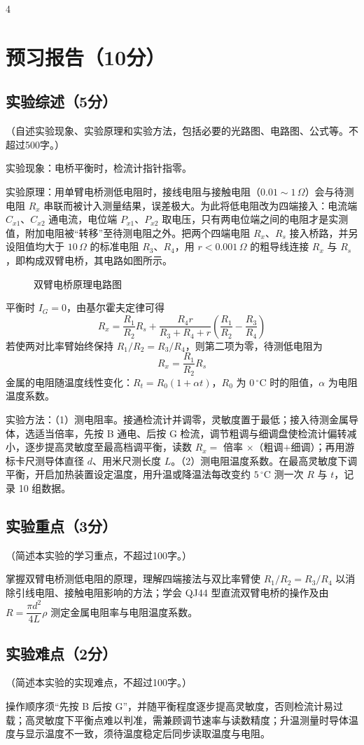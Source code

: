 4\documentclass{Preport}
\begin{document}
\setcounter{page}{1}
\makecover

\section{预习报告（10分）}
\subsection{实验综述（5分）}
（自述实验现象、实验原理和实验方法，包括必要的光路图、电路图、公式等。不超过500字。）

实验现象：电桥平衡时，检流计指针指零。

实验原理：用单臂电桥测低电阻时，接线电阻与接触电阻（$0.01\sim1\,\Omega$）会与待测电阻 $R_x$ 串联而被计入测量结果，误差极大。为此将低电阻改为四端接入：电流端 $C_{x1}$、$C_{x2}$ 通电流，电位端 $P_{x1}$、$P_{x2}$ 取电压，只有两电位端之间的电阻才是实测值，附加电阻被“转移”至待测电阻之外。把两个四端电阻 $R_x$、$R_s$ 接入桥路，并另设阻值均大于 $10\,\Omega$ 的标准电阻 $R_3$、$R_4$，用 $r<0.001\,\Omega$ 的粗导线连接 $R_x$ 与 $R_s$，即构成双臂电桥，其电路如图所示。

\begin{figure}[H]
    \centering
    \ArmBridge
    \caption{双臂电桥原理电路图}
    \label{fig:armbridge}
\end{figure}

平衡时 $I_G=0$，由基尔霍夫定律可得
\begin{equation}
    R_x=\frac{R_1}{R_2}R_s+\frac{R_4 r}{R_3+R_4+r}\left(\frac{R_1}{R_2}-\frac{R_3}{R_4}\right)
    \label{eq:rx}
\end{equation}
若使两对比率臂始终保持 $R_1/R_2=R_3/R_4$，则第二项为零，待测低电阻为
\begin{equation}
    R_x=\frac{R_1}{R_2}R_s
    \label{eq:rx2}
\end{equation}
金属的电阻随温度线性变化：$R_t=R_0(1+\alpha t)$，$R_0$ 为 $0\,^\circ\mathrm{C}$ 时的阻值，$\alpha$ 为电阻温度系数。

实验方法：（1）测电阻率。接通检流计并调零，灵敏度置于最低；接入待测金属导体，选适当倍率，先按 B 通电、后按 G 检流，调节粗调与细调盘使检流计偏转减小，逐步提高灵敏度至最高档调平衡，读数 $R_x=$ 倍率 $\times$（粗调$+$细调）；再用游标卡尺测导体直径 $d$、用米尺测长度 $L$。（2）测电阻温度系数。在最高灵敏度下调平衡，开启加热装置设定温度，用升温或降温法每改变约 $5\,^\circ\mathrm{C}$ 测一次 $R$ 与 $t$，记录 10 组数据。

\subsection{实验重点（3分）}
（简述本实验的学习重点，不超过100字。）

掌握双臂电桥测低电阻的原理，理解四端接法与双比率臂使 $R_1/R_2=R_3/R_4$ 以消除引线电阻、接触电阻影响的方法；学会 QJ44 型直流双臂电桥的操作及由 $R=\dfrac{\pi d^2}{4L}\rho$ 测定金属电阻率与电阻温度系数。

\subsection{实验难点（2分）}
（简述本实验的实现难点，不超过100字。）

操作顺序须“先按 B 后按 G”，并随平衡程度逐步提高灵敏度，否则检流计易过载；高灵敏度下平衡点难以判准，需兼顾调节速率与读数精度；升温测量时导体温度与显示温度不一致，须待温度稳定后同步读取温度与电阻。


\end{document}
